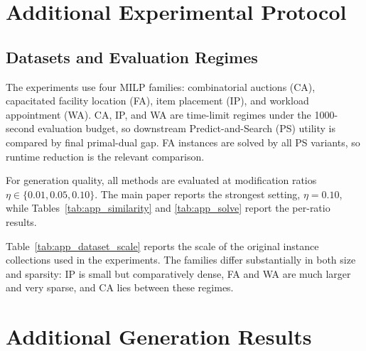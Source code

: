 \documentclass[letterpaper]{article}
\begin{document}
\section{Additional Experimental Protocol}

\subsection{Datasets and Evaluation Regimes}

The experiments use four MILP families: combinatorial auctions (CA),
capacitated facility location (FA), item placement (IP), and workload
appointment (WA). CA, IP, and WA are time-limit regimes under the
1000-second evaluation budget, so downstream Predict-and-Search (PS)
utility is compared by final primal-dual gap. FA instances are solved
by all PS variants, so runtime reduction is the relevant comparison.

For generation quality, all methods are evaluated at modification
ratios $\eta\in\{0.01,0.05,0.10\}$. The main paper reports the strongest
setting, $\eta=0.10$, while Tables~\ref{tab:app_similarity} and
\ref{tab:app_solve} report the per-ratio results.

Table~\ref{tab:app_dataset_scale} reports the scale of the original
instance collections used in the experiments. The families differ
substantially in both size and sparsity: IP is small but comparatively
dense, FA and WA are much larger and very sparse, and CA lies between
these regimes.

\section{Additional Generation Results}
\end{document}
